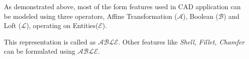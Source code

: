 As demonstrated above, most of the form features used in CAD application can be modeled using  three operators, Affine Transformation ($\mathcal{A}$),  Boolean ($\mathcal{B}$) and Loft ($\mathcal{L}$), operating on Entities($\mathcal{E}$). 

This representation is called as {\bf $\mathcal{ABLE}$}.  Other features like {\em Shell, Fillet, Chamfer} can be formulated using {\bf $\mathcal{ABLE}$}. 

%
%
%
%

